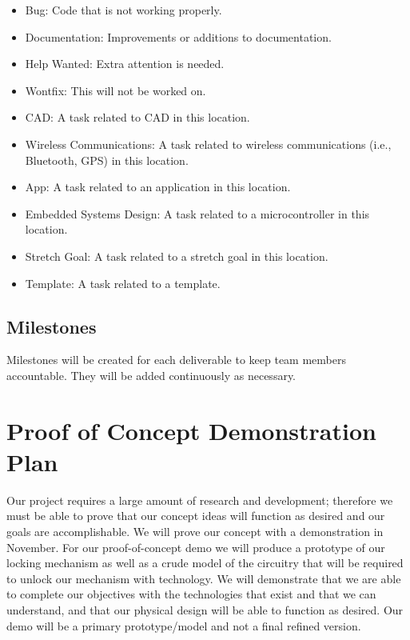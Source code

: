 \documentclass{article}
\begin{document}
\begin{itemize}

\item Bug: Code that is not working properly.
\item Documentation: Improvements or additions to documentation.
\item Help Wanted: Extra attention is needed.
\item Wontfix: This will not be worked on.
\item CAD: A task related to CAD in this location.
\item Wireless Communications: A task related to wireless communications (i.e., Bluetooth, GPS) in this location.
\item App: A task related to an application in this location.
\item Embedded Systems Design: A task related to a microcontroller in this location.
\item Stretch Goal: A task related to a stretch goal in this location. 
\item Template: A task related to a template.
\end{itemize}

\subsection{Milestones}

Milestones will be created for each deliverable to keep team members accountable. They will be added continuously as necessary. 

\section{Proof of Concept Demonstration Plan}

Our project requires a large amount of research and development; therefore we must be able to prove that our concept ideas will function as desired and our goals are accomplishable.  We will prove our concept with a demonstration in November.  For our proof-of-concept demo we will produce a prototype of our locking mechanism as well as a crude model of the circuitry that will be required to unlock our mechanism with technology.  We will demonstrate that we are able to complete our objectives with the technologies that exist and that we can understand, and that our physical design will be able to function as desired.  Our demo will be a primary prototype/model and not a final refined version.  
\end{document}
